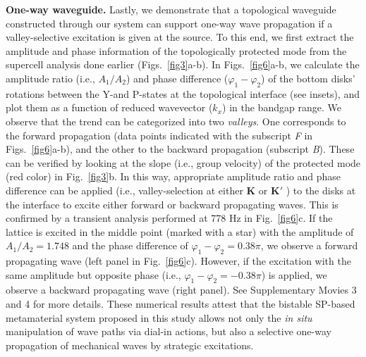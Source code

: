 \documentclass[aps,preprint,onecolumn,showpacs,superscriptaddress,groupedaddress]{revtex4}  %
\begin{document}
\textbf{One-way waveguide.} Lastly, we demonstrate that a topological waveguide constructed through our system can support one-way wave propagation if a valley-selective excitation is given at the source. To this end, we first extract the amplitude and phase information of the topologically protected mode from the supercell analysis done earlier (Figs.~\ref{fig3}a-b). In Figs.~\ref{fig6}a-b, we calculate the amplitude ratio (i.e., $A_1/A_2$) and phase difference (${\varphi _1} - {\varphi _2}$) of the bottom disks' rotations between the Y-and P-states at the topological interface (see insets), and plot them as a function of reduced wavevector ($k_x$) in the bandgap range. We observe that the trend can be categorized into two \textit{valleys}. One corresponds to the forward propagation (data points indicated with the subscript \textit{F} in Figs.~\ref{fig6}a-b), and the other to the backward propagation (subscript \textit{B}). These can be verified by looking at the slope (i.e., group velocity) of the protected mode (red color) in Fig.~\ref{fig3}b. In this way, appropriate amplitude ratio and phase difference can be applied (i.e., valley-selection at either $\mathbf{K}$ or $\mathbf{K'}$ ) to the disks at the interface to excite either forward or backward propagating waves. This is confirmed by a transient analysis performed at 778 Hz in Fig.~\ref{fig6}c. If the lattice is excited in the middle point (marked with a star) with the amplitude of $A_1/A_2 = 1.748$ and the phase difference of ${\varphi _1} - {\varphi _2} = 0.38\pi$, we observe a forward propagating wave (left panel in Fig.~\ref{fig6}c). However, if the excitation with the same amplitude but opposite phase (i.e., ${\varphi _1} - {\varphi _2} = -0.38\pi$) is applied, we observe a backward propagating wave (right panel). See Supplementary Movies 3 and 4 for more details. These numerical results attest that the bistable SP-based metamaterial system proposed in this study  allows not only the \textit{in situ} manipulation of wave paths via dial-in actions, but also a selective one-way propagation of mechanical waves by strategic excitations. %
 
\end{document}
